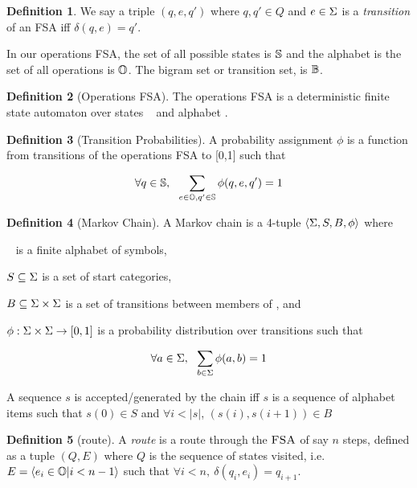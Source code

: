 \documentclass[12pt]{article}
\theoremstyle{definition}
\newtheorem{definition}{Definition}[section]
\begin{document}
\begin{definition}
  We say a triple $(q,e,q')$ where $q,q'\in Q$ and $e\in\Sigma$ is a \textit{transition} of an
  FSA iff $\delta(q,e)=q'$.
\end{definition}

In our operations FSA, the set of all possible states is $\mathbb{S}$ and the alphabet is the set of all operations is $\mathbb{O}$. The bigram set or transition set, is $\mathbb{B}$.


\begin{definition}[Operations FSA]
  The operations FSA is a deterministic finite state automaton over states \STATES~ and alphabet \OPS.
\end{definition}

\begin{definition}[Transition Probabilities]
   
  A probability assignment $\phi$ is a function from transitions of the operations FSA to [0,1] such that

$$\forall q\in \mathbb{S},~~\sum_{e\in\mathbb{O},q'\in \mathbb{S}} \phi(q,e,q') = 1 $$

\end{definition}

\begin{definition}[Markov Chain]
  A Markov chain is a 4-tuple $\langle \Sigma, S, B, \phi  \rangle $ where 

\sg~ is a finite alphabet of symbols, 

$S\subseteq \Sigma$ is a set of start categories,
 
$B\subseteq \Sigma\times\Sigma$ is a set of transitions between members of \sg, and

$\phi: \Sigma \times \Sigma \rightarrow [0,1]$ is a probability distribution over transitions such that

$$\forall a\in \Sigma,~~\sum_{b\in\Sigma} \phi(a,b) = 1 $$


A sequence $s$ is accepted/generated by the chain iff $s$ is a sequence of alphabet items such that $s(0) \in S$ and $\forall i<|s|$, $(s(i),s(i+1))\in B$ 

\end{definition}

\begin{definition}[route]
  A \emph{route} is a route through the $\textsc{FSA}$ of say $n$ steps, defined as a tuple $(Q,E)$ where $Q$ is the sequence of states visited, i.e.
 $E=\langle e_i\in\mathbb{O}|i<n-1\rangle$ such that $\forall i<n,~ \delta(q_i,e_i)=q_{i+1}$.

\end{definition}
\end{document}
